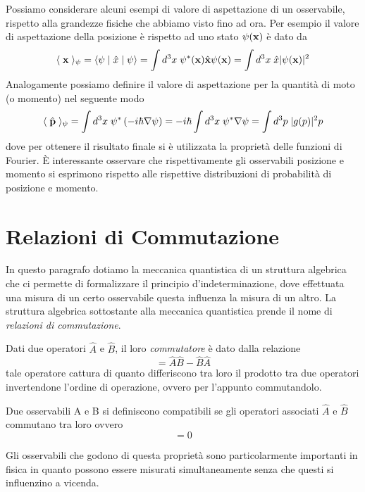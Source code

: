 \noindent Possiamo considerare alcuni esempi di valore di aspettazione di un osservabile, rispetto alla grandezze fisiche che abbiamo visto fino ad ora. Per esempio il valore di aspettazione della posizione \`e rispetto ad uno stato $\psi(\bold{x})$ \`e dato da 
\begin{equation*}
	\langle \; \bold{x} \; \rangle_{\psi} =\langle \psi \;|\; \hat{x}\;|\; \psi \rangle = \int d^3x \; \psi^*(\bold{x})\hat{\bold{x}}\psi(\bold{x}) = \int d^3x \; \hat{x}|\psi(\bold{x})|^2
\end{equation*}
Analogamente possiamo definire il valore di aspettazione per la quantit\`a di moto (o momento) nel seguente modo
\begin{equation*}
	\langle \; \hat{\bold{p}} \; \rangle_{\psi} = \int d^3x \; \psi^* \left ( - i \hbar \nabla \psi\right ) = - i \hbar \int d^3x \; \psi^* \nabla \psi = \int d^3p \; |g(p)|^2p  
\end{equation*}
 dove per ottenere il risultato finale si \`e utilizzata la propriet\`a delle funzioni di Fourier.
 \`E interessante osservare che rispettivamente gli osservabili posizione e momento si esprimono rispetto alle rispettive distribuzioni di probabilit\`a di posizione e momento.
 
 \section{Relazioni di Commutazione}
In questo paragrafo dotiamo la meccanica quantistica di un struttura algebrica che ci permette di formalizzare il principio d'indeterminazione, dove effettuata una misura di un certo osservabile questa influenza la misura di un altro. La struttura algebrica sottostante alla meccanica quantistica prende il nome di \textit{relazioni di commutazione}.
\newline

\noindent Dati due operatori $\hat{A}$ e $\hat{B}$, il loro \textit{commutatore} \`e dato dalla relazione
\begin{equation}
	[\hat{A},\hat{B}] = \hat{A}\hat{B}-\hat{B}\hat{A}
\end{equation}
 tale operatore cattura di quanto differiscono tra loro il prodotto tra due operatori invertendone l'ordine di operazione, ovvero per l'appunto commutandolo.
 \newline
 
 \begin{definition}
 	Due osservabili A e B si definiscono compatibili se gli operatori associati $\hat{A}$ e $\hat{B}$ commutano tra loro ovvero
 	\begin{equation*}
 		[\hat{A},\hat{B}] = 0
 	\end{equation*}
 \end{definition}
 \noindent Gli osservabili che godono di questa propriet\`a sono particolarmente importanti in fisica in quanto possono essere misurati simultaneamente senza che questi si influenzino a vicenda. 
 
